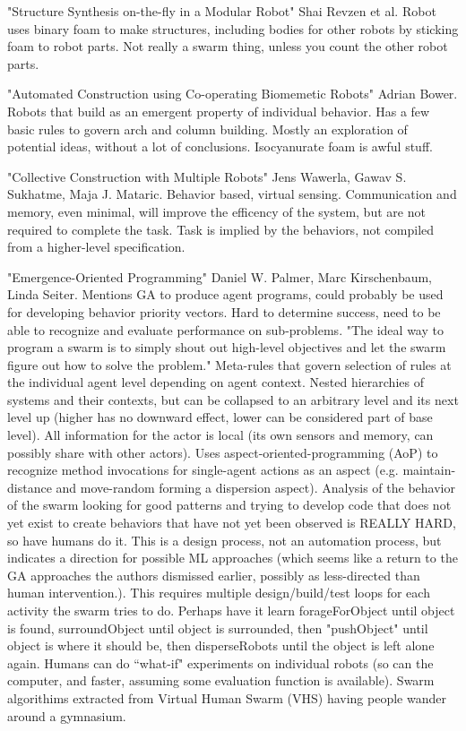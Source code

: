 \documentclass[]{article}
\begin{document}
"Structure Synthesis on-the-fly in a Modular Robot" \cite{revzen2011structure} Shai Revzen et al. Robot uses binary foam to make structures, including bodies for other robots by sticking foam to robot parts. Not really a swarm thing, unless you count the other robot parts.  

"Automated Construction using Co-operating Biomemetic Robots" \cite{bowyer2000automated} Adrian Bower. Robots that build as an emergent property of individual behavior. Has a few basic rules to govern arch and column building. Mostly an exploration of potential ideas, without a lot of conclusions. Isocyanurate foam is awful stuff. 

"Collective Construction with Multiple Robots" \cite{wawerla2002collective} Jens Wawerla, Gawav S. Sukhatme, Maja J. Mataric. Behavior based, virtual sensing. Communication and memory, even minimal, will improve the efficency of the system, but are not required to complete the task. Task is implied by the behaviors, not compiled from a higher-level specification. 

"Emergence-Oriented Programming" \cite{palmer2005emergence} Daniel W. Palmer, Marc Kirschenbaum, Linda Seiter. Mentions GA to produce agent programs, could probably be used for developing behavior priority vectors. Hard to determine success, need to be able to recognize and evaluate performance on sub-problems. "The ideal way to program a swarm is to simply shout out high-level objectives and let the swarm figure out how to solve the problem." Meta-rules that govern selection of rules at the individual agent level depending on agent context. Nested hierarchies of systems and their contexts, but can be collapsed to an arbitrary level and its next level up (higher has no downward effect, lower can be considered part of base level). All information for the actor is local (its own sensors and memory, can possibly share with other actors). Uses aspect-oriented-programming (AoP) to recognize method invocations for single-agent actions as an aspect (e.g. maintain-distance and move-random forming a dispersion aspect). Analysis of the behavior of the swarm looking for good patterns and trying to develop code that does not yet exist to create behaviors that have not yet been observed is REALLY HARD, so have humans do it. This is a design process, not an automation process, but indicates a direction for possible ML approaches (which seems like a return to the GA approaches the authors dismissed earlier, possibly as less-directed than human intervention.). This requires multiple design/build/test loops for each activity the swarm tries to do. Perhaps have it learn forageForObject until object is found, surroundObject until object is surrounded, then "pushObject" until object is where it should be, then disperseRobots until the object is left alone again. Humans can do ``what-if" experiments on individual robots (so can the computer, and faster, assuming some evaluation function is available). Swarm algorithims extracted from Virtual Human Swarm (VHS) having people wander around a gymnasium. 
\end{document}
